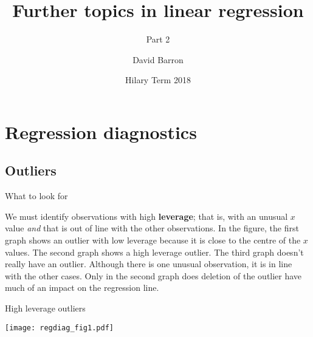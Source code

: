 \documentclass[10pt,ignorenonframetext,]{beamer}
\title{Further topics in linear regression}
\subtitle{Part 2}
\author{David Barron}
\date{Hilary Term 2018}
\begin{document}
\frame{\titlepage}

\section{Regression diagnostics}\label{regression-diagnostics}

\subsection{Outliers}\label{outliers}

\begin{frame}{What to look for}

We must identify observations with high \textbf{leverage}; that is, with
an unusual \(x\) value \emph{and} that is out of line with the other
observations. In the figure, the first graph shows an outlier with low
leverage because it is close to the centre of the \(x\) values. The
second graph shows a high leverage outlier. The third graph doesn't
really have an outlier. Although there is one unusual observation, it is
in line with the other cases. Only in the second graph does deletion of
the outlier have much of an impact on the regression line.

\end{frame}

\begin{frame}{High leverage outliers}

\texttt{[image: regdiag\_fig1.pdf]}

\end{frame}
\end{document}
